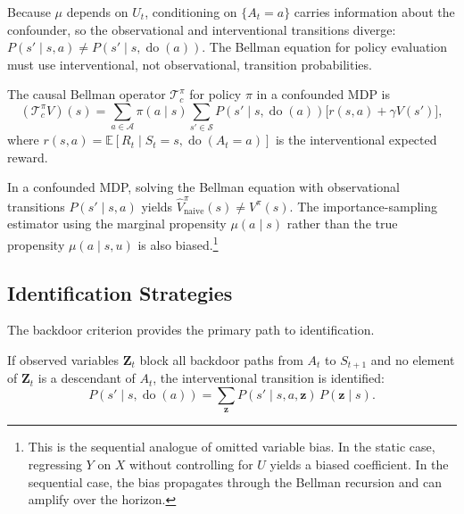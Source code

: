 Because $\mu$ depends on $U_t$, conditioning on $\{A_t = a\}$ carries information about the confounder, so the observational and interventional transitions diverge: $P(s' \mid s, a) \neq P(s' \mid s, \operatorname{do}(a))$. The Bellman equation for policy evaluation must use interventional, not observational, transition probabilities.

\begin{definition}
\label{def:causal_bellman}
The causal Bellman operator $\mathcal{T}_c^\pi$ for policy $\pi$ in a confounded MDP is
\begin{equation}
(\mathcal{T}_c^\pi V)(s) = \sum_{a \in \mathcal{A}} \pi(a \mid s) \sum_{s' \in \mathcal{S}} P(s' \mid s, \operatorname{do}(a)) \bigl[ r(s, a) + \gamma V(s') \bigr],
\label{eq:causal_bellman}
\end{equation}
where $r(s,a) = \mathbb{E}[R_t \mid S_t = s, \operatorname{do}(A_t = a)]$ is the interventional expected reward.
\end{definition}

\begin{lemma}
\label{lem:naive_bias}
In a confounded MDP, solving the Bellman equation with observational transitions $P(s' \mid s, a)$ yields $\hat{V}^{\pi}_{\text{naive}}(s) \neq V^\pi(s)$. The importance-sampling estimator using the marginal propensity $\mu(a \mid s)$ rather than the true propensity $\mu(a \mid s, u)$ is also biased.\footnote{This is the sequential analogue of omitted variable bias. In the static case, regressing $Y$ on $X$ without controlling for $U$ yields a biased coefficient. In the sequential case, the bias propagates through the Bellman recursion and can amplify over the horizon.}
\end{lemma}

\subsection{Identification Strategies}

The backdoor criterion \citep{pearl2009causality} provides the primary path to identification.

\begin{theorem}
\label{thm:backdoor_mdp}
If observed variables $\mathbf{Z}_t$ block all backdoor paths from $A_t$ to $S_{t+1}$ and no element of $\mathbf{Z}_t$ is a descendant of $A_t$, the interventional transition is identified:
\begin{equation}
P(s' \mid s, \operatorname{do}(a)) = \sum_{\mathbf{z}} P(s' \mid s, a, \mathbf{z}) \, P(\mathbf{z} \mid s).
\label{eq:backdoor_mdp}
\end{equation}
\end{theorem}


